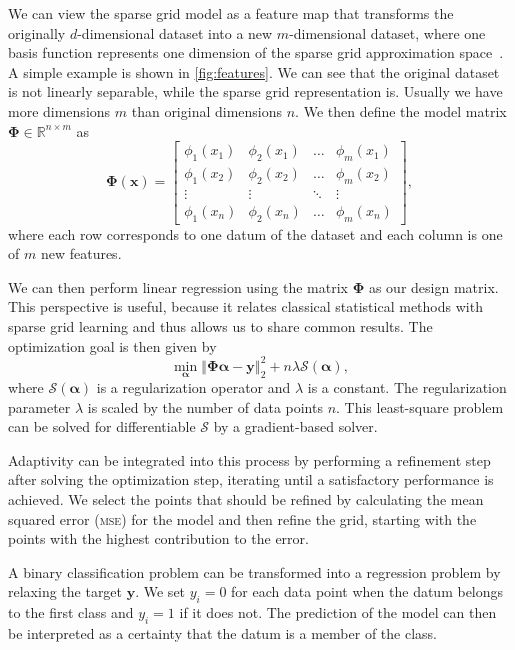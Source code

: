 We can view the sparse grid model as a feature map that transforms the originally
\(d\)-dimensional dataset into a new \(m\)-dimensional dataset, where one basis function represents one dimension of the sparse grid approximation space~\cite{sparse-parsimony}.
A simple example is shown in \cref{fig:features}.
We can see that the original dataset is not linearly separable, while the sparse
grid representation is.
Usually we have more dimensions \(m\) than original dimensions \(n\).
We then define the model matrix \(\bm{\Phi} \in \mathbb{R}^{n \times m}\) as
\begin{equation*}
\bm{\Phi}(\bm{x}) = \begin{bmatrix}
\phi_1(x_1) & \phi_2(x_1) & \hdots & \phi_m(x_1) \\
\phi_1(x_2) & \phi_2(x_2) & \hdots & \phi_m(x_2) \\
\vdots & \vdots & \ddots & \vdots \\
\phi_1(x_n) & \phi_2(x_n) & \hdots & \phi_m(x_n)
\end{bmatrix},
\end{equation*}
where each row corresponds to one datum of the dataset and each column is one of \(m\) new features.

We can then perform linear regression using the matrix \(\bm{\Phi}\) as our
design matrix.
This perspective is useful, because it relates classical statistical methods with sparse grid learning and thus allows us to share common results.
The optimization goal is then given by
\begin{equation}\label{eq:optGoal}
\min_{\bm{\alpha}} \left\Vert  \bm{\Phi} \bm{\alpha} - \bm{y}   \right\Vert_2^2  + n \lambda \mathcal{S}(\bm{\alpha}), 
\end{equation}
where \(\mathcal{S}(\bm{\alpha})\) is a regularization operator and \(\lambda\) is a constant.
The regularization parameter \(\lambda\) is scaled by the number of data points \(n\).
This least-square problem can be solved for differentiable \(\mathcal{S}\) by a gradient-based solver.

Adaptivity can be integrated into this process by performing a refinement step after solving the optimization step, iterating until a satisfactory performance is achieved.
We select the points that should be refined by calculating the mean squared error (\textsc{mse}) for the model and then refine the grid, starting with the points with the highest contribution to the error.

A binary classification problem can be transformed into a regression problem by relaxing the target \(\bm{y}\).
We set \(y_i = 0\) for each data point when the datum belongs to the first class and \(y_i = 1\) if it does not.
The prediction of the model can then be interpreted as a certainty that the datum is a member of the class.

